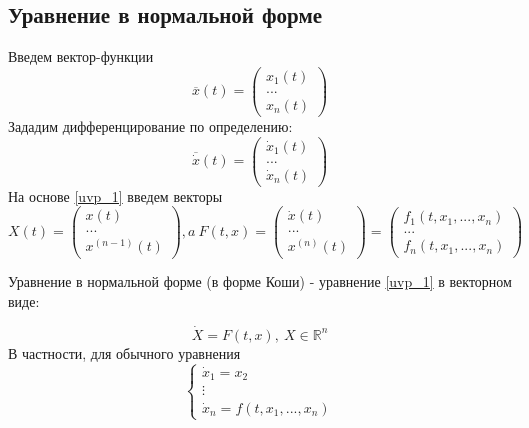 \subsection{Уравнение в нормальной форме}
Введем вектор-функции 
\begin{equation*}
    \overline{x}(t)=\begin{pmatrix} x_1(t)\\...\\x_n(t)\end{pmatrix} 
\end{equation*}
Зададим дифференцирование по определению:
\begin{equation*}
\overline{\dot x}(t)=\begin{pmatrix}\dot x_1(t)\\...\\ \dot x_n(t)\end{pmatrix}
\end{equation*}
На основе \ref{uvp_1} введем векторы
$$X(t)=\begin{pmatrix} x(t)\\...\\ x^{(n-1)}(t) \end{pmatrix},a~
F(t,x)=\begin{pmatrix} \dot x(t)\\...\\ x^{(n)}(t) \end{pmatrix} = 
\begin{pmatrix} f_1(t,x_1,...,x_n)\\...\\f_n(t,x_1,...,x_n)\end{pmatrix}$$
\begin{defin}
    Уравнение в нормальной форме (в форме Коши) - 
    уравнение \ref{uvp_1} в векторном виде: 
\end{defin}
\begin{equation}
    \dot X = F(t,x),~X\in \mathbb{R}^n
\end{equation}
В частности, для обычного уравнения 
$$\begin{cases}
    \dot x_1 = x_2\\ \vdots \\ \dot x_n = f(t,x_1,...,x_n)
\end{cases}$$




